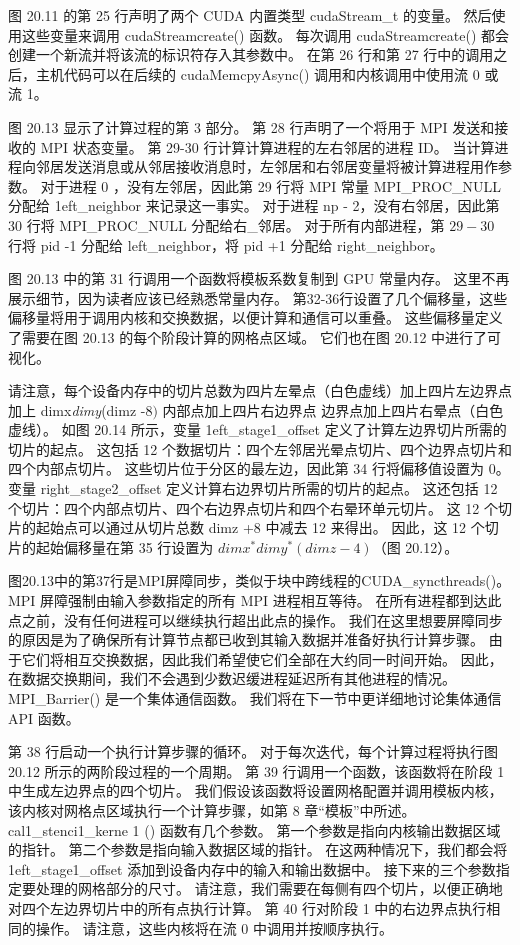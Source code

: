图 20.11 的第 25 行声明了两个 CUDA 内置类型 cudaStream\_t 的变量。 然后使用这些变量来调用 cudaStreamcreate() 函数。 每次调用 cudaStreamcreate() 都会创建一个新流并将该流的标识符存入其参数中。 在第 26 行和第 27 行中的调用之后，主机代码可以在后续的 cudaMemcpyAsync() 调用和内核调用中使用流 0 或流 1。

图 20.13 显示了计算过程的第 3 部分。 第 28 行声明了一个将用于 MPI 发送和接收的 MPI 状态变量。 第 29-30 行计算计算进程的左右邻居的进程 ID。 当计算进程向邻居发送消息或从邻居接收消息时，左邻居和右邻居变量将被计算进程用作参数。 对于进程 0 ，没有左邻居，因此第 29 行将 MPI 常量 MPI\_PROC\_NULL 分配给 1eft\_neighbor 来记录这一事实。 对于进程 np - 2，没有右邻居，因此第 30 行将 MPI\_PROC\_NULL 分配给右\_邻居。 对于所有内部进程，第 $29-30$ 行将 pid -1 分配给 left\_neighbor，将 pid +1 分配给 right\_neighbor。

图 20.13 中的第 31 行调用一个函数将模板系数复制到 GPU 常量内存。 这里不再展示细节，因为读者应该已经熟悉常量内存。 第32-36行设置了几个偏移量，这些偏移量将用于调用内核和交换数据，以便计算和通信可以重叠。 这些偏移量定义了需要在图 20.13 的每个阶段计算的网格点区域。 它们也在图 20.12 中进行了可视化。

请注意，每个设备内存中的切片总数为四片左晕点（白色虚线）加上四片左边界点加上 dimx\textit{dimy}(dimz -8$)$ 内部点加上四片右边界点 边界点加上四片右晕点（白色虚线）。 如图 20.14 所示，变量 1eft\_stage1\_offset 定义了计算左边界切片所需的切片的起点。 这包括 12 个数据切片：四个左邻居光晕点切片、四个边界点切片和四个内部点切片。 这些切片位于分区的最左边，因此第 34 行将偏移值设置为 0。 变量 right\_stage2\_offset 定义计算右边界切片所需的切片的起点。 这还包括 12 个切片：四个内部点切片、四个右边界点切片和四个右晕环单元切片。 这 12 个切片的起始点可以通过从切片总数 dimz +8 中减去 12 来得出。 因此，这 12 个切片的起始偏移量在第 35 行设置为 $d i m x^{*} d i m y^{*}(d i m z-4)$（图 20.12）。

图20.13中的第37行是MPI屏障同步，类似于块中跨线程的CUDA\_syncthreads()。 MPI 屏障强制由输入参数指定的所有 MPI 进程相互等待。 在所有进程都到达此点之前，没有任何进程可以继续执行超出此点的操作。 我们在这里想要屏障同步的原因是为了确保所有计算节点都已收到其输入数据并准备好执行计算步骤。 由于它们将相互交换数据，因此我们希望使它们全部在大约同一时间开始。 因此，在数据交换期间，我们不会遇到少数迟缓进程延迟所有其他进程的情况。 MPI\_Barrier() 是一个集体通信函数。 我们将在下一节中更详细地讨论集体通信 API 函数。

第 38 行启动一个执行计算步骤的循环。 对于每次迭代，每个计算过程将执行图 20.12 所示的两阶段过程的一个周期。 第 39 行调用一个函数，该函数将在阶段 1 中生成左边界点的四个切片。 我们假设该函数将设置网格配置并调用模板内核，该内核对网格点区域执行一个计算步骤，如第 8 章“模板”中所述。 cal1\_stenci1\_kerne 1 () 函数有几个参数。 第一个参数是指向内核输出数据区域的指针。 第二个参数是指向输入数据区域的指针。 在这两种情况下，我们都会将 1eft\_stage1\_offset 添加到设备内存中的输入和输出数据中。 接下来的三个参数指定要处理的网格部分的尺寸。 请注意，我们需要在每侧有四个切片，以便正确地对四个左边界切片中的所有点执行计算。 第 40 行对阶段 1 中的右边界点执行相同的操作。 请注意，这些内核将在流 0 中调用并按顺序执行。

